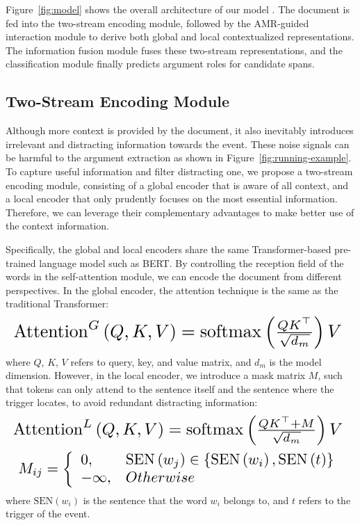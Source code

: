 Figure~\ref{fig:model} shows the overall architecture of our model \modelname. 
The document is fed into the two-stream encoding module, followed by the AMR-guided interaction module to derive both global and local contextualized representations.
The information fusion module fuses these two-stream representations, and the classification module finally predicts argument roles for candidate spans.

\subsection{Two-Stream Encoding Module}

Although more context is provided by the document, it also inevitably introduces irrelevant and distracting information towards the event.
These noise signals can be harmful to the argument extraction as shown in Figure~\ref{fig:running-example}.
To capture useful information and filter distracting one, we propose a two-stream encoding module, consisting of a global encoder that is aware of all context, and a local encoder that only prudently focuses on the most essential information.
Therefore, we can leverage their complementary advantages to make better use of the context information.

Specifically, the global and local encoders share the same Transformer-based pre-trained language model such as BERT.
By controlling the reception field of the words in the self-attention module, we can encode the document from different perspectives.
In the global encoder, the attention technique is the same as the traditional Transformer:
\begin{equation*}
\resizebox{\linewidth}{!}{$
\mathrm{Attention}^G \left (Q,K,V \right ) = \mathrm{softmax} \left (\frac{QK^\top}{\sqrt{d_m}} \right )V
$
}
\label{eq:global-encoder}
\end{equation*}
where $Q$, $K$, $V$ refers to query, key, and value matrix, and $d_m$ is the model dimension.
However, in the local encoder, we introduce a mask matrix $M$, such that tokens can only attend to the sentence itself and the sentence where the trigger locates, to avoid redundant distracting information:
\begin{equation*}
\resizebox{\linewidth}{!}{$
\mathrm{Attention}^L \left (Q,K,V 
\right ) = \mathrm{softmax} \left (\frac{QK^\top+M}{\sqrt{d_m}} \right )V
$
}
\label{eq:local-encoder}
\end{equation*}
\begin{equation*}
\resizebox{\linewidth}{!}{ $
M_{ij} =\left\{
\begin{array}{ll}
0, &  \mathrm{SEN}\left (w_j \right ) \in \left \{\mathrm{SEN} \left (w_i \right ), \mathrm{SEN}\left (t \right ) \right \} \\
-\infty, & Otherwise
\end{array} \right.
$
}
\end{equation*}
where $\mathrm{SEN}\left ( w_i \right )$ is the sentence that the word $w_i$ belongs to, and $t$ refers to the trigger of the event.


